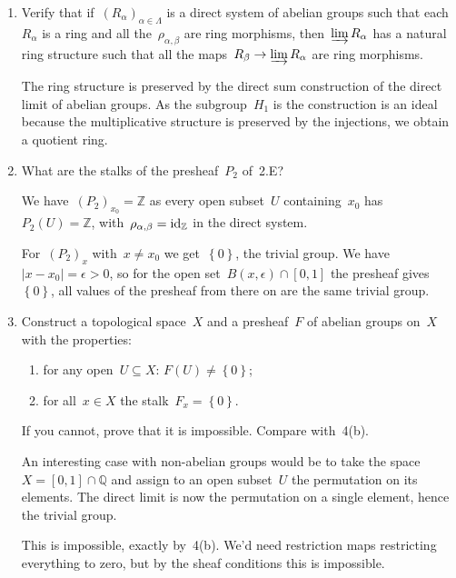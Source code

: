 \documentclass[a4paper,11pt,oneside,openany,article]{memoir}
\begin{document}
\begin{enumerate}
  \item Verify that if~$(R_\alpha)_{\alpha\in\Lambda}$ is a direct system of abelian groups such that each~$R_\alpha$ is a ring and all the~$\rho_{\alpha,\beta}$ are ring morphisms, then~$\varinjlim R_\alpha$ has a natural ring structure such that all the maps~$R_\beta\to\varinjlim R_\alpha$ are ring morphisms.

    \begin{solution}
      The ring structure is preserved by the direct sum construction of the direct limit of abelian groups. As the subgroup~$H_1$ is the construction is an ideal because the multiplicative structure is preserved by the injections, we obtain a quotient ring.
    \end{solution}

  \item What are the stalks of the presheaf~$P_2$ of~2.E?

    \begin{solution}
      We have~$(P_2)_{x_0}=\mathbb{Z}$ as every open subset~$U$ containing~$x_0$ has~$P_2(U)=\mathbb{Z}$, with~$\rho_{\alpha,\beta}=\operatorname{id}_{\mathbb{Z}}$ in the direct system.

      For~$(P_2)_{x}$ with~$x\neq x_0$ we get~$\left\{ 0 \right\}$, the trivial group. We have~$|x-x_0|=\epsilon>0$, so for the open set~$B(x,\epsilon)\cap[0,1]$ the presheaf gives~$\left\{ 0 \right\}$, all values of the presheaf from there on are the same trivial group.
    \end{solution}

  \item Construct a topological space~$X$ and a presheaf~$F$ of abelian groups on~$X$ with the properties:
    \begin{enumerate}
      \item for any open~$U\subseteq X$: $F(U)\neq\left\{ 0 \right\}$;
      \item for all~$x\in X$ the stalk~$F_x=\left\{ 0 \right\}$.
    \end{enumerate}
    If you cannot, prove that it is impossible. Compare with~4(b).

    \begin{solution}
      An interesting case with non-abelian groups would be to take the space~$X=[0,1]\cap\mathbb{Q}$ and assign to an open subset~$U$ the permutation on its elements. The direct limit is now the permutation on a single element, hence the trivial group.

      This is impossible, exactly by~4(b). We'd need restriction maps restricting everything to zero, but by the sheaf conditions this is impossible.
    \end{solution}
\end{enumerate}
\end{document}
